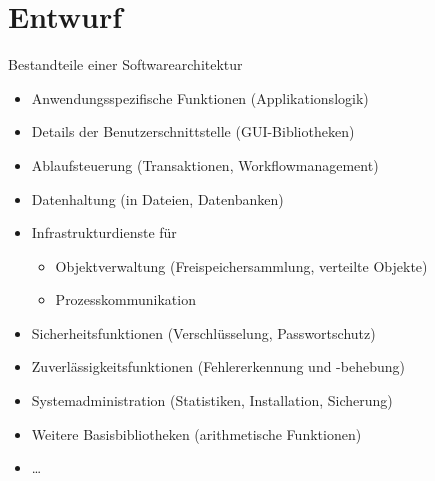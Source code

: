 \section{Entwurf}

\begin{bonus}{Bestandteile einer Softwarearchitektur}
    \begin{itemize}
        \item Anwendungsspezifische Funktionen (Applikationslogik)
        \item Details der Benutzerschnittstelle (GUI-Bibliotheken)
        \item Ablaufsteuerung (Transaktionen, Workflowmanagement)
        \item Datenhaltung (in Dateien, Datenbanken)
        \item Infrastrukturdienste für
              \begin{itemize}
                  \item Objektverwaltung (Freispeichersammlung, verteilte Objekte)
                  \item Prozesskommunikation
              \end{itemize}
        \item Sicherheitsfunktionen (Verschlüsselung, Passwortschutz)
        \item Zuverlässigkeitsfunktionen (Fehlererkennung und -behebung)
        \item Systemadministration (Statistiken, Installation, Sicherung)
        \item Weitere Basisbibliotheken (arithmetische Funktionen)
        \item \ldots
    \end{itemize}
\end{bonus}

